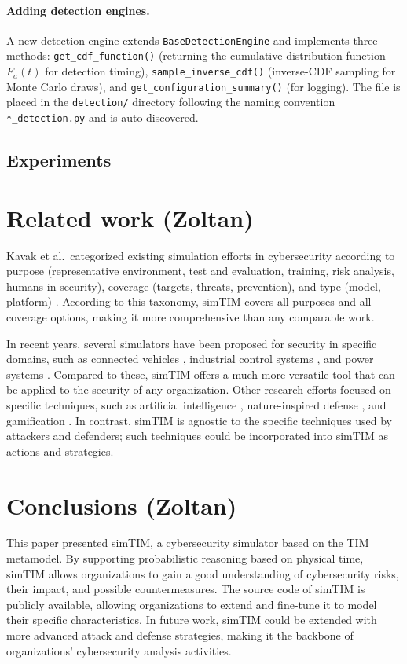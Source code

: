 \documentclass{llncs}
\begin{document}
\paragraph{Adding detection engines.}
A new detection engine extends \texttt{BaseDetectionEngine} and implements three methods: \texttt{get\_cdf\_function()} (returning the cumulative distribution function $F_a(t)$ for detection timing), \texttt{sample\_inverse\_cdf()} (inverse-CDF sampling for Monte Carlo draws), and \texttt{get\_configuration\_summary()} (for logging). The file is placed in the \texttt{detection/} directory following the naming convention \texttt{*\_detection.py} and is auto-discovered.



\subsection{Experiments}

\section{Related work (Zoltan)}

Kavak et al.\ categorized existing simulation efforts in cybersecurity according to purpose (representative environment, test and evaluation, training, risk analysis, humans in security), coverage (targets, threats, prevention), and type (model, platform) \cite{kavak2021simulation}.
According to this taxonomy, simTIM covers all purposes and all coverage options, making it more comprehensive than any comparable work.

In recent years, several simulators have been proposed for security in specific domains, such as connected vehicles \cite{malik2020analysis}, industrial control systems \cite{masi2023securing}, and power systems \cite{qiu2025cyber}.
Compared to these, simTIM offers a much more versatile tool that can be applied to the security of any organization.
Other research efforts focused on specific techniques, such as artificial intelligence \cite{jaber2022towards}, nature-inspired defense \cite{shandilya2022ai}, and gamification \cite{yamin2021serious}.
In contrast, simTIM is agnostic to the specific techniques used by attackers and defenders; such techniques could be incorporated into simTIM as actions and strategies.

\section{Conclusions (Zoltan)}

This paper presented simTIM, a cybersecurity simulator based on the TIM metamodel.
By supporting probabilistic reasoning based on physical time, simTIM allows organizations to gain a good understanding of cybersecurity risks, their impact, and possible countermeasures.
The source code of simTIM is publicly available, allowing organizations to extend and fine-tune it to model their specific characteristics.
In future work, simTIM could be extended with more advanced attack and defense strategies, making it the backbone of organizations' cybersecurity analysis activities.



\end{document}
